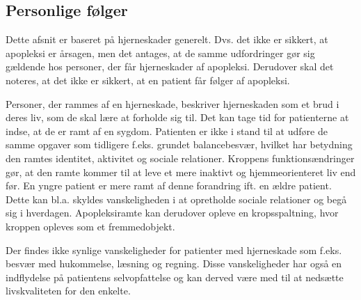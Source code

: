 \subsection{Personlige følger}
Dette afsnit er baseret på hjerneskader generelt. Dvs. det ikke er sikkert, at apopleksi er årsagen, men det antages, at de samme udfordringer gør sig gældende hos personer, der får hjerneskader af apopleksi. Derudover skal det noteres, at det ikke er sikkert, at en patient får følger af apopleksi.

Personer, der rammes af en hjerneskade, beskriver hjerneskaden som et brud i deres liv, som de skal lære at forholde sig til. Det kan tage tid for patienterne at indse, at de er ramt af en sygdom. Patienten er ikke i stand til at udføre de samme opgaver som tidligere f.eks. grundet balancebesvær, hvilket har betydning den ramtes identitet, aktivitet og sociale relationer. Kroppens funktionsændringer gør, at den ramte kommer til at leve et mere inaktivt og hjemmeorienteret liv end før. En yngre patient er mere ramt af denne forandring ift. en ældre patient. Dette kan bl.a. skyldes vanskeligheden i at opretholde sociale relationer og begå sig i hverdagen. Apopleksiramte kan derudover opleve en kropsspaltning, hvor kroppen opleves som et fremmedobjekt. \cite{Sundhedsstyrelsen2010,Badke2009}

Der findes ikke synlige vanskeligheder for patienter med hjerneskade som f.eks. besvær med hukommelse, læsning og regning. Disse vanskeligheder har også en indflydelse på patientens selvopfattelse og  kan derved være med til at nedsætte livskvaliteten for den enkelte. \cite{Sundhedsstyrelsen2010} 




